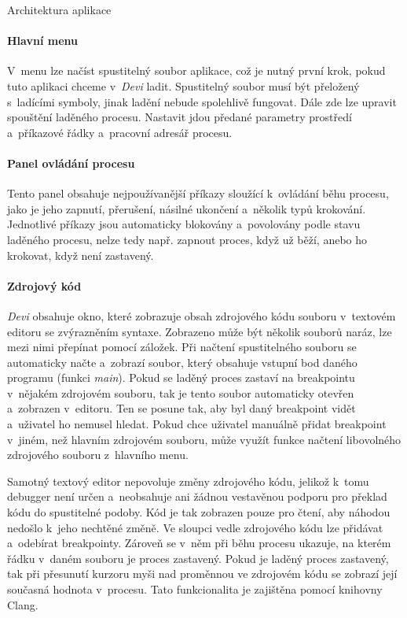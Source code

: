 \documentclass[czech,bachelor,male,python,dept460,hidelinks]{diploma}						%
\newcommand{\parspace}[1][]{
	\ifthenelse{\isempty{#1}}{\vspace{0mm}}{\vspace{#1}}
	\par
}
\begin{document}
\begin{section}{Architektura aplikace}
	
	\paragraph*{Hlavní menu} V~menu lze načíst spustitelný soubor aplikace, což je nutný první krok, pokud tuto aplikaci chceme v~\textit{Devi} ladit.
		Spustitelný soubor musí být přeložený s~ladícími symboly, jinak ladění nebude spolehlivě fungovat. Dále zde lze upravit spouštění laděného procesu.
		Nastavit jdou předané parametry prostředí a~příkazové řádky a~pracovní adresář procesu.
	\paragraph*{Panel ovládání procesu} Tento panel obsahuje nejpoužívanější příkazy sloužící k~ovládání běhu procesu, jako je jeho zapnutí, přerušení, násilné
		ukončení a~několik typů krokování. Jednotlivé příkazy jsou automaticky blokovány a~povolovány podle stavu laděného procesu, nelze tedy např. zapnout
		proces, když už běží, anebo ho krokovat, když není zastavený.
	\paragraph*{Zdrojový kód} \textit{Devi} obsahuje okno, které zobrazuje obsah zdrojového kódu souboru v~textovém editoru se zvýrazněním syntaxe.
		Zobrazeno může být několik souborů naráz, lze mezi nimi přepínat pomocí záložek. Při načtení spustitelného souboru se automaticky načte a~zobrazí soubor,
		který obsahuje vstupní bod daného programu (funkci \textit{main}). Pokud se laděný proces zastaví na breakpointu v~nějakém zdrojovém souboru,
		tak je tento soubor automaticky otevřen a~zobrazen v~editoru. Ten se posune tak, aby byl daný breakpoint vidět a~uživatel ho nemusel hledat.
		Pokud chce uživatel manuálně přidat breakpoint v~jiném, než hlavním zdrojovém souboru, může využít funkce načtení libovolného zdrojového souboru
		z~hlavního menu.
		
		\parspace Samotný textový editor nepovoluje změny zdrojového kódu, jelikož k~tomu debugger není určen a~neobsahuje ani žádnou vestavěnou podporu pro překlad
		kódu do spustitelné podoby. Kód je tak zobrazen pouze pro čtení, aby náhodou nedošlo k~jeho nechtěné změně. Ve sloupci vedle zdrojového kódu lze přidávat
		a~odebírat breakpointy. Zároveň se v~něm při běhu procesu ukazuje, na kterém řádku v~daném souboru je proces zastavený. Pokud je laděný proces zastavený,
		tak při přesunutí kurzoru myši nad proměnnou ve zdrojovém kódu se zobrazí její současná hodnota v~procesu. Tato funkcionalita je
		zajištěna pomocí knihovny Clang.

\end{section}
\end{document}
